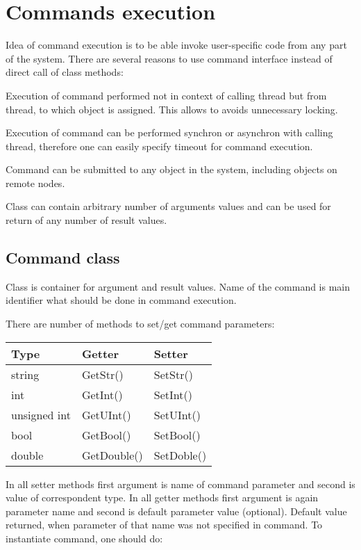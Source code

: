 \section{Commands execution}
\label{prog_services_commands}

Idea of command execution is to be able invoke user-specific 
code from any part of the system. 
There are several reasons to use command interface instead of 
direct call of class methods:
\bbul
\item Execution of command performed not in context of calling thread but from thread, to which 
  object is assigned. This allows to avoids unnecessary locking.
\item Execution of command can be performed synchron or asynchron with calling thread, 
      therefore one can easily specify timeout for command execution. 
\item Command can be submitted to any object in the system, including objects on remote nodes.    
\item Class  can contain arbitrary number of arguments 
      values and can be used for return of any number of result values.    
\ebul 

\subsection{Command class}

Class  is container for argument and result values.
Name of the command is main identifier what should be done in command execution.

There are number of methods to set/get command parameters:

\begin{tabular}{l|l|l}
Type &  Getter & Setter  \\
   \hline
string  & GetStr() &  SetStr() \\
int  & GetInt() &  SetInt() \\
unsigned int  & GetUInt() &  SetUInt() \\
bool  & GetBool() &  SetBool() \\
double  & GetDouble() &  SetDoble() \\
\end{tabular}

In all setter methods first argument is name of command parameter and second is value
of correspondent type. In all getter methods first argument is again parameter name and
second is default parameter value (optional). Default value returned, when
parameter of that name was not specified in command. To instantiate command,
one should do: 

